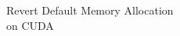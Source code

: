 
\begin{frame}[fragile]

  {\Huge Revert Default Memory Allocation \\ on CUDA}

  \vspace{10pt}

\end{frame}





%        


